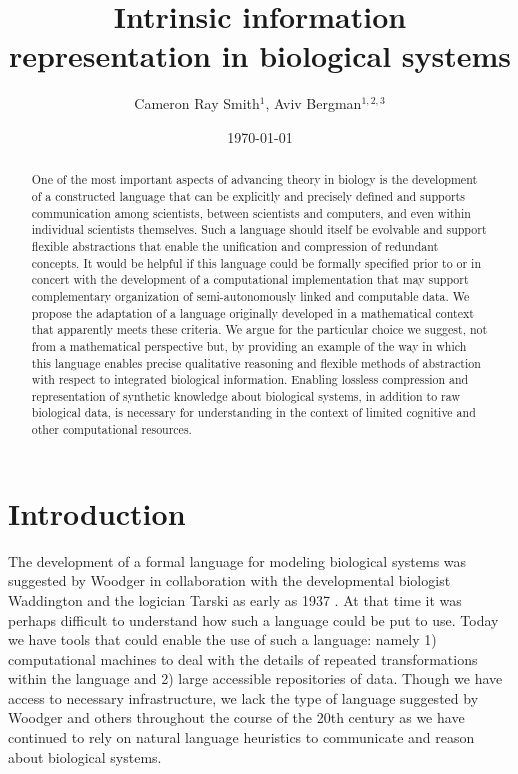 \documentclass[aps,twocolumn]{revtex4}
\begin{document}
 

\title{\bf Intrinsic information representation in biological systems}

\author{Cameron Ray Smith$^{1}$, Aviv Bergman$^{1,2,3}$}


\date{\today}
\begin{abstract}
One of the most important aspects of advancing theory in biology is the development of a constructed language that can be explicitly and precisely defined and supports communication among scientists, between scientists and computers, and even within individual scientists themselves. Such a language should itself be evolvable and support flexible abstractions that enable the unification and compression of redundant concepts. It would be helpful if this language could be formally specified prior to or in concert with the development of a computational implementation that may support complementary organization of semi-autonomously linked and computable data. We propose the adaptation of a language originally developed in a mathematical context that apparently meets these criteria. We argue for the particular choice we suggest, not from a mathematical perspective but, by providing an example of the way in which this language enables precise qualitative reasoning and flexible methods of abstraction with respect to integrated biological information. Enabling lossless compression and representation of synthetic knowledge about biological systems, in addition to raw biological data, is necessary for understanding in the context of limited cognitive and other computational resources.
\end{abstract}

\maketitle

\tableofcontents

\section{Introduction}
The development of a formal language for modeling biological systems was suggested by Woodger in collaboration with the developmental biologist Waddington and the logician Tarski as early as 1937 \cite{Woodger1937,Woodger1951,Woodger1952,Woodger1952a}. At that time it was perhaps difficult to understand how such a language could be put to use. Today we have tools that could enable the use of such a language: namely 1) computational machines to deal with the details of repeated transformations within the language and 2) large accessible repositories of data. Though we have access to necessary infrastructure, we lack the type of language suggested by Woodger and others throughout the course of the 20th century as we have continued to rely on natural language heuristics to communicate and reason about biological systems.
\end{document}
